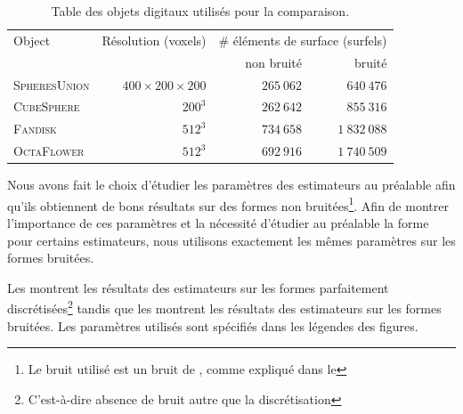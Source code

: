 %
\begin{table}[h]
  \begin{center}
    \caption{Table des objets digitaux utilisés pour la comparaison.}
    \label{tab:feature-objects}
    \begin{tabular}{@{}lrrr@{}}
      \toprule
      Object & Résolution (voxels) & \multicolumn{2}{r}{\# éléments de surface (surfels)} \\ \cmidrule(l){3-4}
                     &            & non bruité & bruité \\ \midrule
      \textsc{SpheresUnion}    & $400 \times 200 \times 200$ & $265~062$ & $640~476$ \\
      \textsc{CubeSphere}     & $200^3$    & $262~642$ & $855~316$   \\
      \textsc{Fandisk}        & $512^3$    & $734~658$ & $1~832~088$   \\
      \textsc{OctaFlower}     & $512^3$    & $692~916$ & $1~740~509$   \\ \bottomrule
    \end{tabular}
  \end{center}
\end{table}


Nous avons fait le choix d'étudier les paramètres des estimateurs au préalable
afin qu'ils obtiennent de bons résultats sur des formes non bruitées\footnote{Le
bruit utilisé est un bruit de \Kanungo, comme expliqué dans le
}. Afin de montrer l'importance de ces paramètres et
la nécessité d'étudier au préalable la forme pour certains estimateurs, nous
utilisons exactement les mêmes paramètres sur les formes bruitées.


Les  montrent les
résultats des estimateurs sur les formes parfaitement
discrétisées\footnote{C'est-à-dire absence de bruit autre que la discrétisation}
tandis que les
montrent les résultats des estimateurs sur les formes bruitées. Les paramètres
utilisés sont spécifiés dans les légendes des figures.

